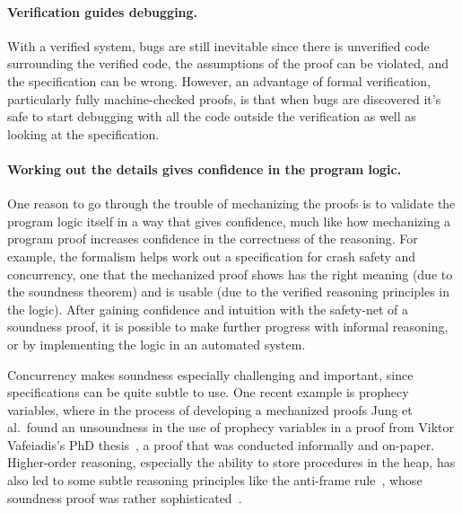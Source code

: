 \paragraph{Verification guides debugging.} With a verified system, bugs are
still inevitable since there is unverified code surrounding the verified code,
the assumptions of the proof can be violated, and the specification can be
wrong. However, an advantage of formal verification, particularly fully
machine-checked proofs, is that when bugs are discovered it's safe to start
debugging with all the code outside the verification as well as looking at the
specification.



\paragraph{Working out the details gives confidence in the program logic.} One
reason to go through the trouble of mechanizing the proofs is to validate the
program logic itself in a way that gives confidence, much like how mechanizing a program proof increases
confidence in the correctness of the reasoning. For example, the formalism helps
work out a specification for crash safety and concurrency, one that the
mechanized proof shows has the right meaning (due to the soundness theorem) and
is usable (due to the verified reasoning principles in the logic). After gaining
confidence and intuition with the safety-net of a soundness proof, it is possible to make
further progress with informal reasoning, or by implementing the logic in an automated system.

Concurrency makes soundness especially challenging and important, since specifications can be quite
subtle to use. One recent example is prophecy variables, where in the process of
developing a mechanized proofs Jung et al.\ found an unsoundness in the use of
prophecy variables in a proof from Viktor Vafeiadis's PhD
thesis~\cite{jung:prophecy,vafeiadis-phd}, a proof that was conducted informally
and on-paper. Higher-order reasoning, especially the ability to store procedures
in the heap, has also led to some subtle reasoning principles like the
anti-frame rule~\cite{pottier:anti-frame}, whose soundness proof was rather
sophisticated~\cite{schwinghammer:semantic-anti-frame}.


